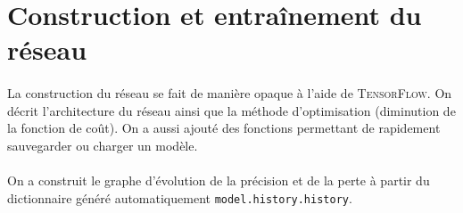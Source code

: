 \documentclass{article}
\begin{document}
  \section{Construction et entraînement du réseau}

  \paragraph{} La construction du réseau se fait de manière opaque à l'aide de \textsc{TensorFlow}. On décrit l'architecture du réseau ainsi que la méthode d'optimisation (diminution de la fonction de coût). On a aussi ajouté des fonctions permettant de rapidement sauvegarder ou charger un modèle.

  \paragraph{} On a construit le graphe d'évolution de la précision et de la perte à partir du dictionnaire généré automatiquement \texttt{model.history.history}.
\end{document}
